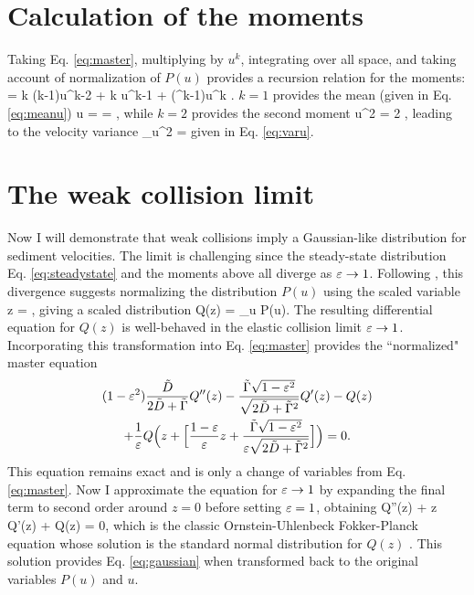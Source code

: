 \section{Calculation of the moments}
\label{sec:langmoments}
Taking Eq. \ref{eq:master}, multiplying by $u^k$, integrating over all space, and taking account of normalization of $P(u)$ provides a recursion relation for the moments: 
 =  k (k-1)\langle u^{k-2} \rangle + \tilde{\Gamma} k \langle u^{k-1} \rangle + (\ve^k-1)\langle u^k \rangle. \ee
$k=1$ provides the mean (given in Eq. \ref{eq:meanu})
\be \langle u \rangle =   = , \ee
while $k=2$ provides the second moment
\be \langle u^2 \rangle = 2 , \ee
leading to the velocity variance
\be \sigma_u^2 = \ee
given in Eq. \ref{eq:varu}.
\section{The weak collision limit}
\label{sec:langextremes}
Now I will demonstrate that weak collisions imply a Gaussian-like distribution for sediment velocities. The limit is challenging since the steady-state distribution Eq. \ref{eq:steadystate} and the moments above all diverge as $\varepsilon \rightarrow 1$.
Following \cite{Hall1989}, this divergence suggests normalizing the distribution $P(u)$ using the scaled variable
\be z = , \ee
giving a scaled distribution
\be Q(z) = \sigma_u P(u).\ee
The resulting differential equation for $Q(z)$ is well-behaved in the elastic collision limit $\varepsilon \rightarrow 1$.
Incorporating this transformation into Eq. \ref{eq:master} provides the ``normalized" master equation
\begin{multline}(1-\varepsilon^2) \frac{\tilde{D}}{2\tilde{D} + \tilde{\Gamma}} Q''(z) - \frac{\tilde{\Gamma}\sqrt{1-\varepsilon^2}}{\sqrt{2\tilde{D}+\tilde{\Gamma}^2}}Q'(z) - Q(z) \\+ \frac{1}{\varepsilon} Q\Big(z + \Big[\frac{1-\varepsilon}{\varepsilon}z + \frac{\tilde{\Gamma}\sqrt{1-\varepsilon^2}}{\varepsilon\sqrt{2\tilde{D}+\tilde{\Gamma}^2}} \Big]\Big) = 0 .\end{multline}
This equation remains exact and is only a change of variables from Eq. \ref{eq:master}.
Now I approximate the equation for $\varepsilon \rightarrow 1$ by expanding the final term to second order around $z=0$ before setting $\varepsilon = 1$, obtaining
\be Q''(z) + z Q'(z) + Q(z) = 0, \ee
which is the classic Ornstein-Uhlenbeck Fokker-Planck equation whose solution is the standard normal distribution for $Q(z)$ \citep[e.g.][]{Gardiner1983}.
This solution provides Eq. \ref{eq:gaussian} when transformed back to the original variables $P(u)$ and $u$.

